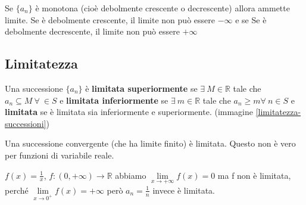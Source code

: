 \begin{theorem}
Se $\{a_n\}$ è monotona (cioè debolmente crescente o decrescente) allora ammette limite.
Se è debolmente crescente, il limite non può essere $-\infty$ e se Se è debolmente decrescente, il limite non può essere $+\infty$
\end{theorem}

\subsection{Limitatezza}
\begin{definition}[Limitatezza]
Una successione $\{a_n\}$ è \textbf{limitata superiormente} se $\exists\: M \in \mathbb{R}$ tale che $a_n \subseteq M \:\forall\: \in S$ e \textbf{limitata inferiormente} se $\exists \:m \in \mathbb{R}$ tale che $a_n \geq m \forall \: n \in S$ e \textbf{limitata} se è limitata sia inferiormente e superiormente. (immagine \ref{limitatezza-successioni})
\end{definition}

\begin{observation}
Una successione convergente (che ha limite finito) è limitata. Questo non è vero per funzioni di variabile reale.
\end{observation}

\begin{example}
$f(x) = \frac{1}{x}$, $f: (0,+\infty)\to \mathbb{R}$ abbiamo $\lim\limits_{x\to +\infty}f(x) = 0$ ma f non è limitata, perché $\lim\limits_{x\to 0^+}f(x) = +\infty$ però $a_n = \frac{1}{n}$ invece è limitata.
\end{example}

